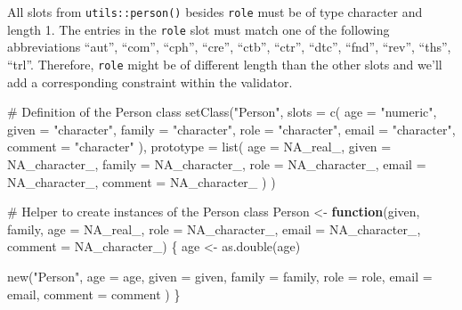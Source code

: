 \documentclass[
]{krantz}
\makeatletter
\newenvironment{Shaded}{\begin{snugshade}}{\end{snugshade}}
\newcommand{\CommentTok}[1]{\textcolor[rgb]{0.56,0.35,0.01}{\textit{#1}}}
\newcommand{\ControlFlowTok}[1]{\textcolor[rgb]{0.13,0.29,0.53}{\textbf{#1}}}
\newcommand{\DataTypeTok}[1]{\textcolor[rgb]{0.13,0.29,0.53}{#1}}
\newcommand{\KeywordTok}[1]{\textcolor[rgb]{0.13,0.29,0.53}{\textbf{#1}}}
\newcommand{\NormalTok}[1]{#1}
\newcommand{\OtherTok}[1]{\textcolor[rgb]{0.56,0.35,0.01}{#1}}
\newcommand{\StringTok}[1]{\textcolor[rgb]{0.31,0.60,0.02}{#1}}
\newenvironment{kframe}{%
\medskip{}
\setlength{\fboxsep}{.8em}
 \def\at@end@of@kframe{}%
 \ifinner\ifhmode%
  \def\at@end@of@kframe{\end{minipage}}%
  \begin{minipage}{\columnwidth}%
 \fi\fi%
 \def\FrameCommand##1{\hskip\@totalleftmargin \hskip-\fboxsep
 \colorbox{shadecolor}{##1}\hskip-\fboxsep
     \hskip-\linewidth \hskip-\@totalleftmargin \hskip\columnwidth}%
 \MakeFramed {\advance\hsize-\width
   \@totalleftmargin\z@ \linewidth\hsize
   \@setminipage}}%
 {\par\unskip\endMakeFramed%
 \at@end@of@kframe}
\renewenvironment{Shaded}{\begin{kframe}}{\end{kframe}}
\renewcommand{\KeywordTok} [1]{\textcolor[rgb]{0.00,0.44,0.13}{{#1}}}
\renewcommand{\DataTypeTok}[1]{\textcolor[rgb]{0.56,0.13,0.00}{{#1}}}
\renewcommand{\StringTok}  [1]{\textcolor[rgb]{0.25,0.44,0.63}{{#1}}}
\renewcommand{\CommentTok} [1]{\textcolor[rgb]{0.38,0.63,0.69}{{#1}}}
\renewcommand{\OtherTok}   [1]{\textcolor[rgb]{0.00,0.44,0.13}{{#1}}}
\renewcommand{\NormalTok}  [1]{{#1}}
\makeatother
\begin{document}
All slots from \texttt{utils::person()} besides \texttt{role} must be of type character and length 1. The entries in the \texttt{role} slot must match one of the following abbreviations ``aut'', ``com'', ``cph'', ``cre'', ``ctb'', ``ctr'', ``dtc'', ``fnd'', ``rev'', ``ths'', ``trl''. Therefore, \texttt{role} might be of different length than the other slots and we'll add a corresponding constraint within the validator.

\begin{Shaded}
\begin{Highlighting}[]
\CommentTok{# Definition of the Person class}
\KeywordTok{setClass}\NormalTok{(}\StringTok{"Person"}\NormalTok{, }
         \DataTypeTok{slots =} \KeywordTok{c}\NormalTok{(}
           \DataTypeTok{age =} \StringTok{"numeric"}\NormalTok{,}
           \DataTypeTok{given =} \StringTok{"character"}\NormalTok{,}
           \DataTypeTok{family =} \StringTok{"character"}\NormalTok{,}
           \DataTypeTok{role =} \StringTok{"character"}\NormalTok{,}
           \DataTypeTok{email =} \StringTok{"character"}\NormalTok{,}
           \DataTypeTok{comment =} \StringTok{"character"}
\NormalTok{         ),}
         \DataTypeTok{prototype =} \KeywordTok{list}\NormalTok{(}
           \DataTypeTok{age =} \OtherTok{NA_real_}\NormalTok{,}
           \DataTypeTok{given =} \OtherTok{NA_character_}\NormalTok{,}
           \DataTypeTok{family =} \OtherTok{NA_character_}\NormalTok{,}
           \DataTypeTok{role =} \OtherTok{NA_character_}\NormalTok{,}
           \DataTypeTok{email =} \OtherTok{NA_character_}\NormalTok{,}
           \DataTypeTok{comment =} \OtherTok{NA_character_}
\NormalTok{         )}
\NormalTok{)}

\CommentTok{# Helper to create instances of the Person class}
\NormalTok{Person <-}\StringTok{ }\ControlFlowTok{function}\NormalTok{(given, family, }
                   \DataTypeTok{age =} \OtherTok{NA_real_}\NormalTok{, }
                   \DataTypeTok{role =} \OtherTok{NA_character_}\NormalTok{,}
                   \DataTypeTok{email =} \OtherTok{NA_character_}\NormalTok{,}
                   \DataTypeTok{comment =} \OtherTok{NA_character_}\NormalTok{) \{}
\NormalTok{  age <-}\StringTok{ }\KeywordTok{as.double}\NormalTok{(age)}
  
  \KeywordTok{new}\NormalTok{(}\StringTok{"Person"}\NormalTok{, }
      \DataTypeTok{age =}\NormalTok{ age, }
      \DataTypeTok{given =}\NormalTok{ given, }
      \DataTypeTok{family =}\NormalTok{ family, }
      \DataTypeTok{role =}\NormalTok{ role, }
      \DataTypeTok{email =}\NormalTok{ email,}
      \DataTypeTok{comment =}\NormalTok{ comment}
\NormalTok{  )}
\NormalTok{\}}


\end{Highlighting}
\end{Shaded}
\end{document}
